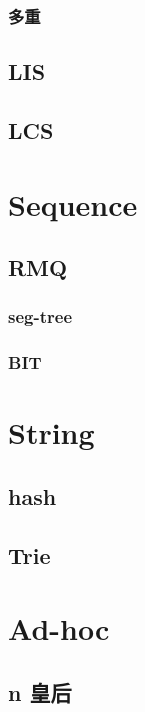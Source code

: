 \subsubsection{多重}


\subsection{LIS}


\subsection{LCS}


\section{Sequence}

\subsection{RMQ}
\subsubsection{seg-tree}


\subsubsection{BIT}

% 

\section{String}

\subsection{hash}


\subsection{Trie}


\section{Ad-hoc}

\subsection{n 皇后}

